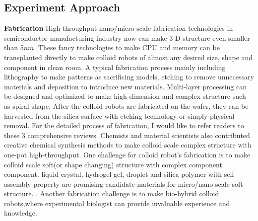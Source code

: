 \subsection{Experiment Approach}

\textbf{Fabrication}  High throughput nano/micro scale fabrication technologies in semiconductor manufacturing industry now can make 3-D structure even smaller than 5$nm$.\cite{mokhlesi2010three} These fancy technologies to make CPU and memory can be transplanted directly to make colloid robots of almost any desired size, shape and component in clean room.\cite{koman2018colloidal} A typical fabrication process mainly including lithography to make patterns as sacrificing models, etching to remove unnecessary materials and deposition to introduce new materials. Multi-layer processing can be designed and optimized to make high dimension and complex structure such as spiral shape\cite{zhang2009artificial}. After the colloid robots are fabricated on the wafer, they can be harvested from the silica surface with etching technology or simply physical removal. For the detailed process of fabrication, I would like to refer readers to these 3 comprehensive reviews\cite{wong2016synthetic,wang2017emerging, zha2018tubular}. Chemists and material scientists also contributed creative chemical synthesis methods to make colloid scale complex structure with one-pot high-throughput\cite{youssef2016shape,gong2017patchy,wang2019active}. One challenge for colloid robot's fabrication is to   make  colloid scale soft(or shape changing) structure with complex component component. liquid crystal, hydrogel gel, droplet and silica polymer with self assembly property are promising candidate materials for micro/nano scale soft structure. \cite{leong2009tetherless,denkov2015self,zhang2017printing,wei2019molecular}. Another fabrication challenge is to make bio-hybrid colloid robots,where experimental biologist can provide invaluable experience and knowledge.\cite{stanton2016biohybrid,magdanz2013development}

